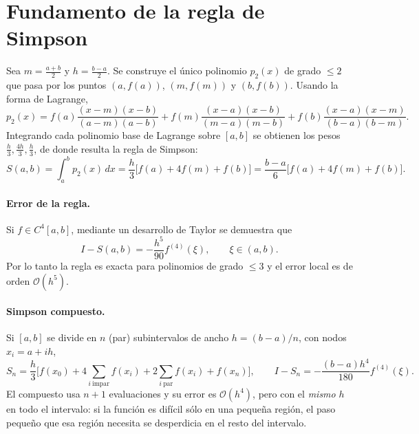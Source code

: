 \documentclass[11pt,letterpaper]{report}
\begin{document}
\section{Fundamento de la regla de Simpson}
Sea $m=\frac{a+b}{2}$ y $h=\frac{b-a}{2}$. Se construye el único polinomio
$p_2(x)$ de grado $\le 2$ que pasa por los puntos $(a,f(a))$, $(m,f(m))$ y $(b,f(b))$.
Usando la forma de Lagrange,
\[
p_2(x)=f(a)\frac{(x-m)(x-b)}{(a-m)(a-b)}+f(m)\frac{(x-a)(x-b)}{(m-a)(m-b)}
      +f(b)\frac{(x-a)(x-m)}{(b-a)(b-m)} .
\]
Integrando cada polinomio base de Lagrange sobre $[a,b]$ se obtienen los pesos
$\frac{h}{3},\frac{4h}{3},\frac{h}{3}$, de donde resulta la regla de Simpson:
\begin{equation}
  S(a,b)=\int_a^b p_2(x)\,dx=\frac{h}{3}\Big[f(a)+4f(m)+f(b)\Big]
        =\frac{b-a}{6}\Big[f(a)+4f(m)+f(b)\Big].
  \label{eq:simpson}
\end{equation}

\paragraph{Error de la regla.} Si $f\in C^4[a,b]$, mediante un desarrollo de Taylor se demuestra que
\begin{equation}
  I-S(a,b)=-\frac{h^5}{90}f^{(4)}(\xi),\qquad \xi\in(a,b).
  \label{eq:error}
\end{equation}
Por lo tanto la regla es exacta para polinomios de grado $\le 3$ y el error local
es de orden $\mathcal{O}(h^5)$.

\paragraph{Simpson compuesto.} Si $[a,b]$ se divide en $n$ (par) subintervalos de ancho
$h=(b-a)/n$, con nodos $x_i=a+ih$,
\begin{equation}
  S_n=\frac{h}{3}\Big[f(x_0)+4\sum_{i\ \text{impar}}f(x_i)+2\sum_{i\ \text{par}}f(x_i)+f(x_n)\Big],
  \qquad I-S_n=-\frac{(b-a)h^4}{180}f^{(4)}(\xi).
\end{equation}
El compuesto usa $n+1$ evaluaciones y su error es $\mathcal{O}(h^4)$, pero con el
\emph{mismo} $h$ en todo el intervalo: si la función es difícil sólo en una pequeña región,
el paso pequeño que esa región necesita se desperdicia en el resto del intervalo.
\end{document}
